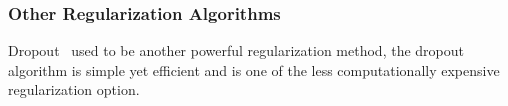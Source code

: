 \subsubsection{Other Regularization Algorithms}

Dropout~\cite{JMLR:v15:srivastava14a} used to be another powerful regularization method, the dropout algorithm is simple yet efficient and is one of the less computationally expensive regularization option. 